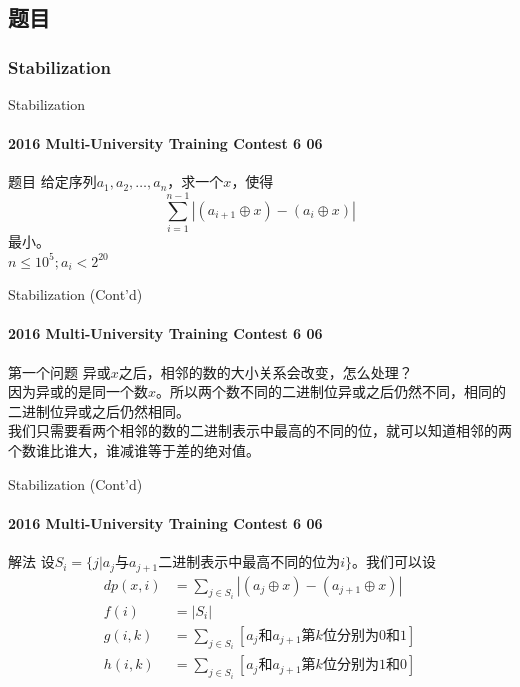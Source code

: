 \documentclass[hyperref={unicode=true}]{beamer}
\theoremstyle{definition}
\theoremstyle{proof}
\begin{document}
\subsection{题目}
\subsubsection{Stabilization}
\begin{frame}{Stabilization}\framesubtitle{2016 Multi-University Training Contest 6 06}
  \begin{block}{题目}
    给定序列$a_1,a_2,\ldots,a_n$，求一个$x$，使得
    \[\sum_{i=1}^{n-1}{|(a_{i+1} \oplus x) -  (a_{i} \oplus x)|}\]
    最小。\\
    $n\leq 10^5;a_i < 2^{20}$
  \end{block}
\end{frame}

\begin{frame}{Stabilization (Cont'd)}\framesubtitle{2016 Multi-University Training Contest 6 06}
  \begin{alertblock}{第一个问题}
    异或$x$之后，相邻的数的大小关系会改变，怎么处理？\\
    \pause{}因为异或的是同一个数$x$。所以两个数不同的二进制位异或之后仍然不同，相同的二进制位异或之后仍然相同。\\
    \pause{}我们只需要看两个相邻的数的二进制表示中最高的不同的位，就可以知道相邻的两个数谁比谁大，谁减谁等于差的绝对值。
  \end{alertblock}
\end{frame}

\begin{frame}{Stabilization (Cont'd)}\framesubtitle{2016 Multi-University Training Contest 6 06}
  \begin{exampleblock}{解法}
    设$S_i=\{j|a_j\text{与}a_{j+1}\text{二进制表示中最高不同的位为}i\}$。我们可以设
    \begin{align}
      dp(x, i)&=\sum_{j\in S_i}{|(a_j\oplus x)-(a_{j+1} \oplus x)|}\\
      f(i)&=|S_i|\\
      g(i,k)&=\sum_{j \in S_i}[a_j\text{和}a_{j+1}\text{第}k\text{位分别为0和1}]\\
      h(i,k)&=\sum_{j \in S_i}[a_j\text{和}a_{j+1}\text{第}k\text{位分别为1和0}]
    \end{align}
  \end{exampleblock}
\end{frame}
\end{document}
